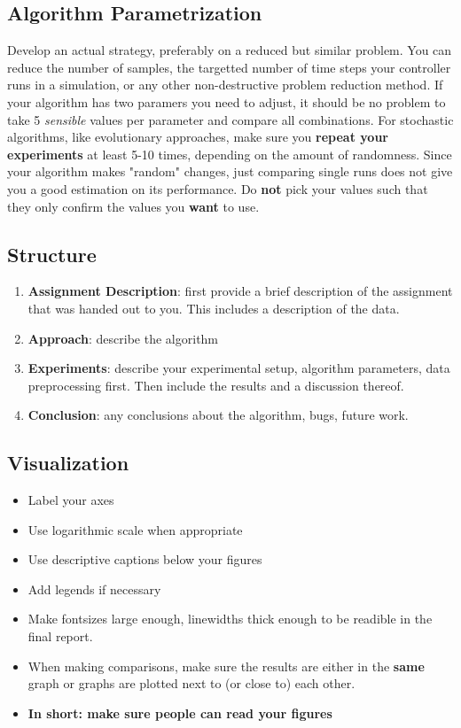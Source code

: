 \documentclass{hbrs-ecta-report}
\begin{document}
\subsection{Algorithm Parametrization}
Develop an actual strategy, preferably on a reduced but similar problem. You can reduce the number of samples, the targetted number of time steps your controller runs in a simulation, or any other non-destructive problem reduction method. If your algorithm has two paramers you need to adjust, it should be no problem to take 5 \textit{sensible} values per parameter and compare all combinations. For stochastic algorithms, like evolutionary approaches, make sure you \textbf{repeat your experiments} at least 5-10 times, depending on the amount of randomness. Since your algorithm makes "random" changes, just comparing single runs does not give you a good estimation on its performance. Do \textbf{not} pick your values such that they only confirm the values you \textbf{want} to use.

\subsection{Structure}
\label{sec:structure}
\begin{enumerate}
\item \textbf{Assignment Description}: first provide a brief description of the assignment that was handed out to you. This includes a description of the data.
\item \textbf{Approach}: describe the algorithm
\item \textbf{Experiments}: describe your experimental setup, algorithm parameters, data preprocessing first. Then include the results and a discussion thereof.
\item \textbf{Conclusion}: any conclusions about the algorithm, bugs, future work.
\end{enumerate}
\subsection{Visualization}
\label{sec:visualization}

\begin{itemize}
\item Label your axes
\item Use logarithmic scale when appropriate
\item Use descriptive captions below your figures
\item Add legends if necessary
\item Make fontsizes large enough, linewidths thick enough to be readible in the final report.
\item When making comparisons, make sure the results are either in the \textbf{same} graph or graphs are plotted next to (or close to) each other.
\item \textbf{In short: make sure people can read your figures}
\end{itemize}
\end{document}
